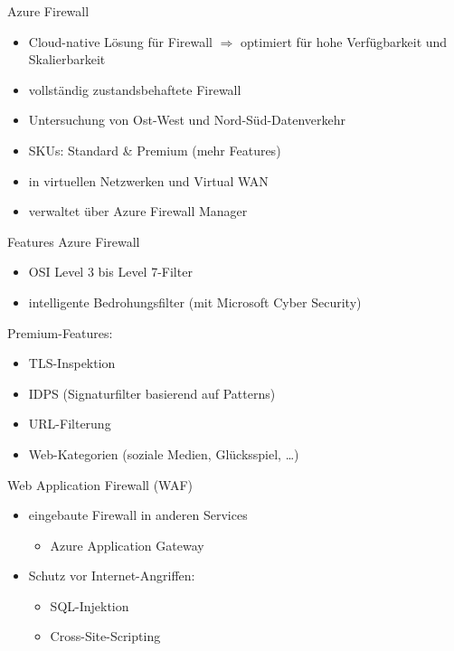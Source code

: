 \begin{flashcard}[]{Azure Firewall}
  \begin{itemize}
    \item Cloud-native Lösung für Firewall\newline
      $\Rightarrow$ optimiert für hohe Verfügbarkeit und Skalierbarkeit
    \item vollständig zustandsbehaftete Firewall
    \item Untersuchung von Ost-West und Nord-Süd-Datenverkehr
    \item SKUs: Standard \& Premium (mehr Features)
    \item in virtuellen Netzwerken und Virtual WAN
    \item verwaltet über Azure Firewall Manager
  \end{itemize}
\end{flashcard}

\begin{flashcard}[]{Features Azure Firewall}
  \begin{itemize}
    \item OSI Level 3 bis Level 7-Filter
    \item intelligente Bedrohungsfilter (mit Microsoft Cyber Security)
  \end{itemize}
  Premium-Features:
  \begin{itemize}
    \item TLS-Inspektion
    \item IDPS (Signaturfilter basierend auf Patterns)
    \item URL-Filterung
    \item Web-Kategorien (soziale Medien, Glücksspiel, \ldots)
  \end{itemize}
\end{flashcard}

\begin{flashcard}[]{Web Application Firewall (WAF)}
  \begin{itemize}
    \item eingebaute Firewall in anderen Services
      \begin{itemize}
        \item Azure Application Gateway
      \end{itemize}
    \item Schutz vor Internet-Angriffen:
      \begin{itemize}
        \item SQL-Injektion
        \item Cross-Site-Scripting
      \end{itemize}
  \end{itemize}
\end{flashcard}

